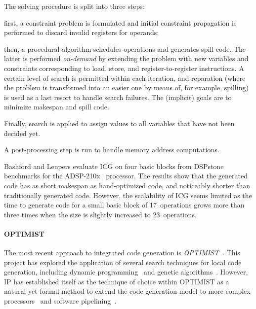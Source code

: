\documentclass[acmsmall,authorversion,nonacm]{acmart}
\begin{document}
The solving procedure is split into three steps:
\begin{inparaitem}[]
\item first, a constraint problem is formulated and initial constraint
  propagation is performed to discard invalid registers for operands;
\item then, a procedural algorithm schedules operations and generates
  spill code. The latter is performed \emph{on-demand} by extending
  the problem with new variables and constraints corresponding to
  load, store, and register-to-register instructions. A certain level
  of search is permitted within each iteration, and reparation (where
  the problem is transformed into an easier one by means of, for
  example, spilling) is used as a last resort to handle search
  failures. The (implicit) goals are to minimize makespan and
  spill code.
\item Finally, search is applied to assign values to all variables
  that have not been decided yet.
\end{inparaitem}
A post-processing step is run to handle memory address computations.

Bashford and Leupers evaluate ICG on four basic blocks from
DSPstone~\cite{Vojin1994} benchmarks for the
ADSP-210x~\cite{SH} processor.
The results show that the generated code has as short makespan as
hand-optimized code, and noticeably shorter than traditionally
generated code.
However, the scalability of ICG seems limited as the time to generate
code for a small basic block of 17~operations grows more than three
times when the size is slightly increased to 23~operations.

\paragraph{OPTIMIST}

The most recent approach to integrated code generation is
\emph{OPTIMIST}~\cite{Eriksson2012}.
This project has explored the application of several search techniques
for local code generation, including dynamic
programming~\cite{Kessler2001,Kessler2006} and genetic
algorithms~\cite{Eriksson2008}.
However, IP has established itself as the technique of choice within
OPTIMIST as a natural yet formal method to extend the code generation
model to more complex processors~\cite{Eriksson2008} and software
pipelining~\cite{Eriksson2009,Eriksson2012}.
\end{document}
